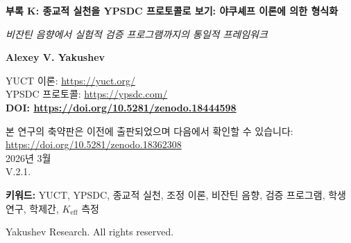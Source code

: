 \documentclass[12pt,a4paper]{article}
\begin{document}
	
	\begin{titlepage}
		\begin{center}
			\vspace*{0cm}
			
			\Huge\textbf{부록 K: 종교적 실천을 YPSDC 프로토콜로 보기: 야쿠셰프 이론에 의한 형식화}
			
			\vspace{1cm}
			
			\small\textit{비잔틴 음향에서 실험적 검증 프로그램까지의 통일적 프레임워크}
			
			\vspace{0.5cm}
			
			\small\textbf{Alexey V. Yakushev}
			
			\vspace{0cm}
			
			YUCT 이론: \url{https://yuct.org/}\\
			YPSDC 프로토콜: \url{https://ypsdc.com/}\\
			
			\vspace{2cm}
			\textbf{DOI: \url{https://doi.org/10.5281/zenodo.18444598}}\\
			
			\vspace{1cm}
			
			\vspace{0cm}
			\large 
			본 연구의 축약판은 이전에 출판되었으며 다음에서 확인할 수 있습니다: \\ \url{https://doi.org/10.5281/zenodo.18362308}\\
			\vspace{1cm}
			2026년 3월 \\ \large V.2.1.
			\newpage
			\begin{abstract}
				\noindent
				본 문서는 야쿠셰프 통합 조정 이론(YUCT)과 YPSDC(야쿠셰프 동기 분산 조정 프로토콜)의 관점에서 종교적 실천을 포괄적으로 형식화합니다. 제1부에서는 종교 의식이 사전 분배된 사전을 사용하는 고도로 최적화된 조정 프로토콜로서 기능함을 보여주고, 비잔틴 교회의 음향이 조정 효율을 위한 건축적 최적화의 전형적인 예임을 입증합니다. 제2부에서는 YUCT 프레임워크의 극단적인 통합력을 개괄하고, 실험적 검증을 위한 상세한 연구 프로그램을 제시하며, 학생 연구를 과학적 검증의 초석으로 강조합니다. 이 프레임워크는 측정 가능한 지표($K_{\mathrm{eff}}$), 검증 가능한 예측, 물리학·생물학에서 사회학·종교학에 이르는 학제간 응용을 제공합니다.
			\end{abstract}
			
			\vspace{0cm}
			
			\noindent
			\small\textbf{키워드:} YUCT, YPSDC, 종교적 실천, 조정 이론, 비잔틴 음향, 검증 프로그램, 학생 연구, 학제간, $K_{\mathrm{eff}}$ 측정
			
			\vspace{0.5cm}
			
			\noindent
			 Yakushev Research. All rights reserved.
		\end{center}
	\end{titlepage}
	
\end{document}

